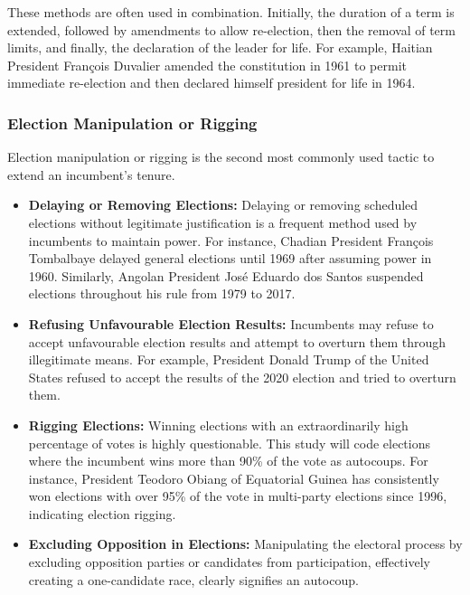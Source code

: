 \documentclass[
  12pt,
]{report}
\begin{document}
These methods are often used in combination. Initially, the duration of
a term is extended, followed by amendments to allow re-election, then
the removal of term limits, and finally, the declaration of the leader
for life. For example, Haitian President François Duvalier amended the
constitution in 1961 to permit immediate re-election and then declared
himself president for life in 1964.

\subsubsection*{Election Manipulation or
Rigging}\label{election-manipulation-or-rigging}

Election manipulation or rigging is the second most commonly used tactic
to extend an incumbent's tenure.

\begin{itemize}
\item
  \textbf{Delaying or Removing Elections:} Delaying or removing
  scheduled elections without legitimate justification is a frequent
  method used by incumbents to maintain power. For instance, Chadian
  President François Tombalbaye delayed general elections until 1969
  after assuming power in 1960. Similarly, Angolan President José
  Eduardo dos Santos suspended elections throughout his rule from 1979
  to 2017.
\item
  \textbf{Refusing Unfavourable Election Results:} Incumbents may refuse
  to accept unfavourable election results and attempt to overturn them
  through illegitimate means. For example, President Donald Trump of the
  United States refused to accept the results of the 2020 election and
  tried to overturn them.
\item
  \textbf{Rigging Elections:} Winning elections with an extraordinarily
  high percentage of votes is highly questionable. This study will code
  elections where the incumbent wins more than 90\% of the vote as
  autocoups. For instance, President Teodoro Obiang of Equatorial Guinea
  has consistently won elections with over 95\% of the vote in
  multi-party elections since 1996, indicating election rigging.
\item
  \textbf{Excluding Opposition in Elections:} Manipulating the electoral
  process by excluding opposition parties or candidates from
  participation, effectively creating a one-candidate race, clearly
  signifies an autocoup.
\end{itemize}
\end{document}
